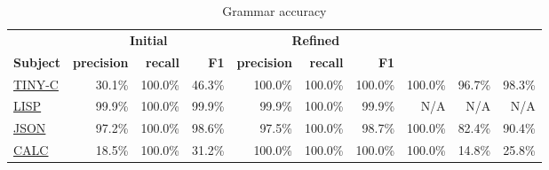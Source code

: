 \def\AverageRefinedPrecision{99.5\%\xspace}
\def\AverageRefinedRecall{100.0\%\xspace}
\def\LowestInitialPrecision{18.5\%\xspace}
\def\HighestInitialPrecision{99.9\%\xspace}
\def\LowestRefinedPrecision{97.5\%\xspace}

\begin{table*}[t]
\caption{Grammar accuracy}
\label{tab:accuracy}
\begin{tabular}{l|rrr|rrr|rrr}
\rowcolor{lime}
        & \multicolumn{3}{c}{\textbf{Initial}}
        & \multicolumn{3}{c}{\textbf{Refined}}
        \\
\rowcolor{lime}
\textbf{Subject} & \textbf{precision} & \textbf{recall} & \textbf{F1}
                      & \textbf{precision} & \textbf{recall} & \textbf{F1}
                      \\
\href{http://www.iro.umontreal.ca/~felipe/IFT2030-Automne2002/Complements/tinyc.c}{TINY-C}  & 30.1\%    & 100.0\%    & 46.3\%                                                             & 100.0\%   & 100.0\%     & 100.0\%                                                             & 100.0\%   & 96.7\%     & 98.3\%                                                             \\
\href{https://github.com/mystor/simple-lisp-parser-in-c/blob/master/parse.c}{LISP}  & 99.9\%    & 100.0\%    & 99.9\%                                                             & 99.9\%   & 100.0\%     & 99.9\%                                                             & N/A   & N/A     & N/A                                                             \\
\href{https://github.com/vrthra/mimid/blob/master/Cmimid/examples/json.c}{JSON}  & 97.2\%    & 100.0\%    & 98.6\%                                                             & 97.5\%   & 100.0\%     & 98.7\%                                                             & 100.0\%   & 82.4\%     & 90.4\%                                                             \\
\href{https://github.com/fbuihuu/parser/blob/master/rdp.c}{CALC}  & 18.5\%    & 100.0\%    & 31.2\%                                                             & 100.0\%   & 100.0\%     & 100.0\%                                                             & 100.0\%   & 14.8\%     & 25.8\%                                                             \\
\end{tabular}
\end{table*}
